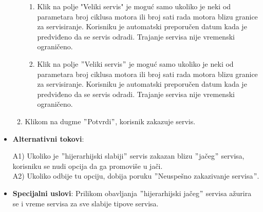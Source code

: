 \documentclass[a4paper]{article}
\begin{document}
\begin{itemize}
\begin{enumerate}
         \begin{enumerate}[label=3.3.\arabic*]
            \item Klik na polje "Veliki servis" je moguć samo ukoliko je neki od parametara broj ciklusa motora ili broj sati rada motora blizu granice za servisiranje. Korisniku je automatski preporučen datum kada je predviđeno da se servis odradi. Trajanje servisa nije vremenski ograničeno.
            \item Klik na polje $"$Veliki servis$"$ je moguć samo ukoliko je neki od parametara broj ciklusa motora ili broj sati rada motora blizu granice za servisiranje. Korisniku je automatski preporučen datum kada je predviđeno da se servis odradi. Trajanje servisa nije vremenski ograničeno.
        \end{enumerate}
        \item Klikom na dugme $"$Potvrdi$"$, korisnik zakazuje servis.
        
    \end{enumerate}
    \item \textbf{Alternativni tokovi}:
        \begin{itemize}
        A1) Ukoliko je $"$hijerarhijski slabiji$"$ servis zakazan blizu $"$jačeg$"$ servisa, korisniku se nudi opcija da ga promoviše u jači. \\
        A2) Ukoliko odbije tu opciju, dobija poruku $"$Neuspešno zakazivanje servisa$"$.
        \end{itemize}
    \item \textbf{Specijalni uslovi}: Prilikom obavljanja $"$hijerarhijski jačeg$"$ servisa ažurira se i vreme servisa za sve slabije tipove servisa.
\end{itemize}
\end{document}

